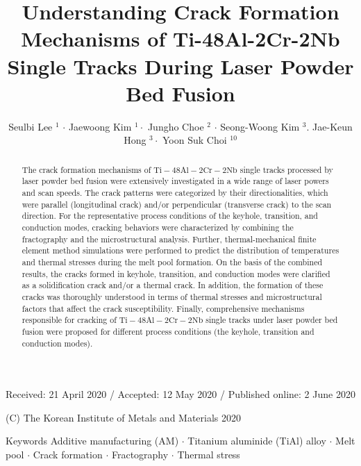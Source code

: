\documentclass[10pt]{article}
\title{Understanding Crack Formation Mechanisms of Ti-48Al-2Cr-2Nb Single Tracks During Laser Powder Bed Fusion }
\author{Seulbi Lee ${ }^{1}$ $\cdot$ Jaewoong Kim ${ }^{1} \cdot$ Jungho Choe $^{2}$ $\cdot$ Seong-Woong Kim ${ }^{3}$. Jae-Keun Hong ${ }^{3} \cdot$ Yoon Suk Choi ${ }^{10}$}
\date{}
\begin{document}
\maketitle
Received: 21 April 2020 / Accepted: 12 May 2020 / Published online: 2 June 2020

(C) The Korean Institute of Metals and Materials 2020

\begin{abstract}
The crack formation mechanisms of $\mathrm{Ti}-48 \mathrm{Al}-2 \mathrm{Cr}-2 \mathrm{Nb}$ single tracks processed by laser powder bed fusion were extensively investigated in a wide range of laser powers and scan speeds. The crack patterns were categorized by their directionalities, which were parallel (longitudinal crack) and/or perpendicular (transverse crack) to the scan direction. For the representative process conditions of the keyhole, transition, and conduction modes, cracking behaviors were characterized by combining the fractography and the microstructural analysis. Further, thermal-mechanical finite element method simulations were performed to predict the distribution of temperatures and thermal stresses during the melt pool formation. On the basis of the combined results, the cracks formed in keyhole, transition, and conduction modes were clarified as a solidification crack and/or a thermal crack. In addition, the formation of these cracks was thoroughly understood in terms of thermal stresses and microstructural factors that affect the crack susceptibility. Finally, comprehensive mechanisms responsible for cracking of $\mathrm{Ti}-48 \mathrm{Al}-2 \mathrm{Cr}-2 \mathrm{Nb}$ single tracks under laser powder bed fusion were proposed for different process conditions (the keyhole, transition and conduction modes).
\end{abstract}

Keywords Additive manufacturing (AM) $\cdot$ Titanium aluminide (TiAl) alloy $\cdot$ Melt pool $\cdot$ Crack formation $\cdot$ Fractography $\cdot$ Thermal stress
\end{document}
